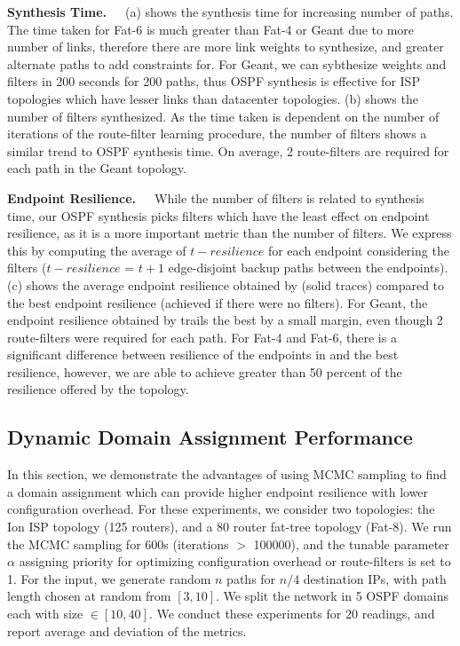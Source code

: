 \noindent\textbf{Synthesis Time.}~~~(a) 
shows the synthesis time for increasing number of paths. 
The time taken for Fat-6 is much greater than Fat-4 or Geant
due to more number of links, therefore there are more link weights
to synthesize, and greater alternate paths to add constraints for. 
For Geant, we can sybthesize weights and filters in 200 seconds 
for 200 paths, thus OSPF synthesis is effective for ISP topologies
which have lesser links than datacenter topologies. 
(b) shows the number of filters synthesized. 
As the time taken is dependent on the number of iterations of
the route-filter learning procedure, the number of filters
shows a similar trend to OSPF synthesis time. On average, 2 route-filters
are required for each path in the Geant topology. 

\noindent\textbf{Endpoint Resilience.}~~~While the number of 
filters is related to synthesis time, our OSPF synthesis picks
filters which have the least effect on endpoint resilience, as it  
is a more important metric than the number of filters. We express this
by computing the average of $t-resilience$ for each endpoint considering
the filters ($t-resilience$ = $t+1$ edge-disjoint backup paths between the 
endpoints).
(c) shows the average
endpoint resilience obtained by \name (solid traces) 
compared to the best endpoint resilience (achieved
if there were no filters). For Geant, the endpoint 
resilience obtained by \name trails the best by a small margin,
even though 2 route-filters were required for each path. For
Fat-4 and Fat-6, there is a significant difference between resilience
of the endpoints in \name and the best resilience, 
however, we are able to achieve greater than
50 percent of the resilience offered by the topology. 

\subsection{Dynamic Domain Assignment Performance} \label{sec:mcmceval}
In this section, we demonstrate the advantages of using MCMC sampling
to find a domain assignment which can provide higher endpoint resilience
with lower configuration overhead. For these experiments, we consider 
two topologies: the Ion ISP topology (125 routers), and a 80 router 
fat-tree topology (Fat-8). We run the MCMC sampling for 600s (iterations
$>$ 100000), and the tunable parameter $\alpha$ assigning priority for 
optimizing configuration overhead or route-filters is set to 1. For 
the input, we generate random $n$ paths for $n/4$ destination IPs, with
path length chosen at random from $[3,10]$. We split the network
in 5 OSPF domains each with size $\in [10,40]$. We conduct these
experiments for 20 readings, and report average and deviation of the metrics. 

